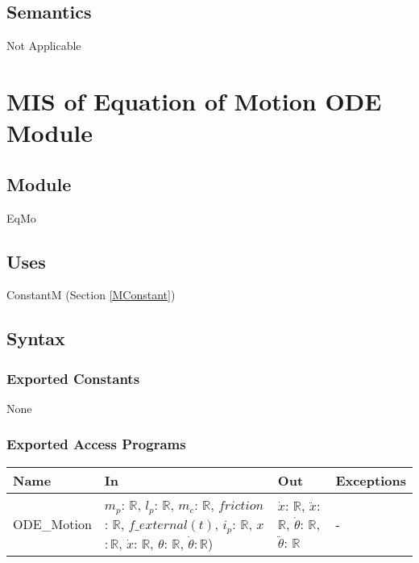 \documentclass[12pt, titlepage]{article}
\begin{document}
\subsection{Semantics}

Not Applicable



\newpage
\section{MIS of Equation of Motion ODE Module  \label{MC} }


\subsection{Module}

EqMo

\subsection{Uses}

ConstantM (Section \ref{MConstant})


\subsection{Syntax}

\subsubsection{Exported Constants}
None
\subsubsection{Exported Access Programs}

\begin{center}
\begin{tabular}{p{3cm} p{6cm} p{4cm} p{3cm}}
\hline
\textbf{Name} & \textbf{In} & \textbf{Out} & \textbf{Exceptions} \\
\hline
ODE\_Motion & $ m_p$: $\mathbb{R}$, $l_p$: $\mathbb{R}$, $m_c$: $\mathbb{R}$, $friction$: $\mathbb{R}$, $f\_external(t)$, $i_p$: $\mathbb{R}$, $x$$: \mathbb{R}$, $\dot{x}$: $\mathbb{R}$, $\theta$: $\mathbb{R}$, $\dot{\theta}$$: \mathbb{R}$) & $\dot{x}$: $\mathbb{R}$, $\ddot{x}$: $\mathbb{R}$, $\dot{\theta}$: $\mathbb{R}$, $\ddot{\theta}$: $\mathbb{R}$  & - \\
\end{tabular}
\end{center}
\end{document}

